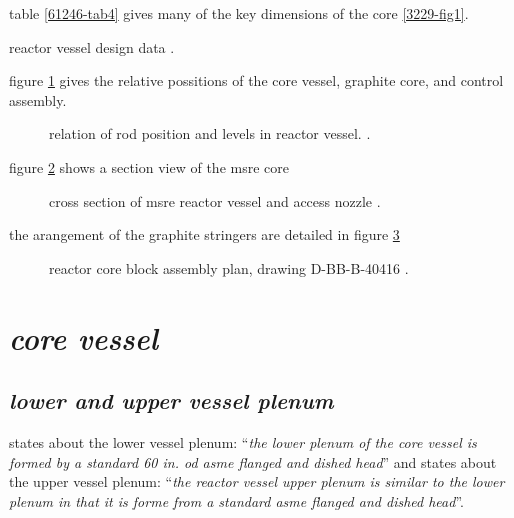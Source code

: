 \documentclass[ms,a4paper]{memoir}
\newcommand*{\mrsarchive}{../../msr-archive}%
\begin{document}
table \ref{61246-tab4} gives many of the key dimensions of the core \ref{3229-fig1}.
\begin{table}[H]
  \centering
  \caption{reactor vessel design data \parencite[table 4]{ad-cf-61-2-46}.}
  \label{61246-tab4}
\end{table}

figure \ref{4233-fig2} gives the relative possitions of the core vessel, graphite core, and control assembly.
\begin{figure}[H]
  \centering
  \caption{relation of rod position and levels in reactor vessel. \parencite[table 4]{ornl-4233}.}
  \label{4233-fig2}
\end{figure}

figure \ref{0728-p109-p110} shows a section view of the msre core
\begin{figure}[H]
  \centering
  \caption{cross section of msre reactor vessel and access nozzle \parencite[page 109-110]{ornl-tm-0728}.}
  \label{0728-p109-p110}
\end{figure}

the arangement of the graphite stringers are detailed in figure \ref{4174-p10-p11}
\begin{figure}[H]
  \centering
  \caption{reactor core block assembly plan, drawing D-BB-B-40416 \parencite[page 13]{ornl-tm-4174}.}
  \label{4174-p10-p11}
\end{figure}

\section{\emph{core vessel}}
\subsection{\emph{lower and upper vessel plenum}}
\textcite[page 14]{ornl-tm-3229} states about the lower vessel plenum:
\enquote{\textit{the lower plenum of the core vessel is formed by a standard 60 in. od asme flanged and dished head}} and \textcite[page 25]{ornl-tm-3229} states about the upper vessel plenum:
\enquote{\textit{the reactor vessel upper plenum is similar to the lower plenum in that it is forme from a standard asme flanged and dished head}}.
\end{document}
